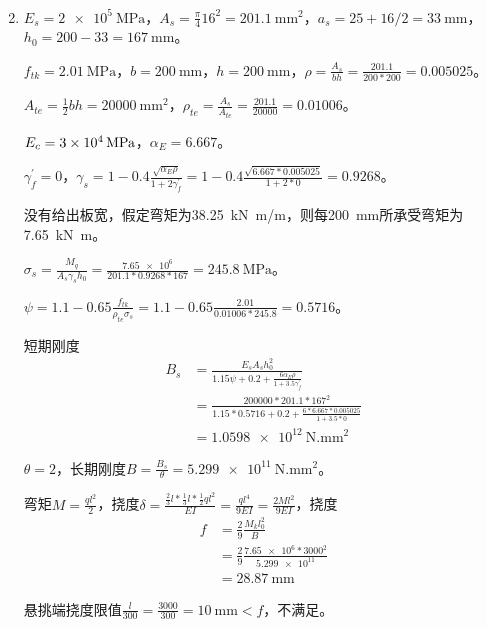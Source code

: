 \begin{enumerate}
\begin{align*}
          \end{align*}
    \item $E_s=\SI{2e5}{\MPa}$，$A_s=\frac{\pi}{4}16^2=\SI{201.1}{\mm^2}$，$a_s=25+16/2=\SI{33}{\mm}$，$h_0=200-33=\SI{167}{\mm}$。
          \par $f_{tk}=\SI{2.01}{\MPa}$，$b=\SI{200}{\mm}$，$h=\SI{200}{\mm}$，$\rho=\frac{A_s}{bh}=\frac{201.1}{200*200}=0.005025$。
          \par $A_{te}=\frac{1}{2}bh=\SI{20000}{\mm^2}$，$\rho_{te}=\frac{A_s}{A_{te}}=\frac{201.1}{20000}=0.01006$。
          \par $E_c=\SI{3E4}{\MPa}$，$\alpha_E=6.667$。
          \par $\gamma_f^\prime=0$，$\gamma_s=1-0.4\frac{\sqrt{\alpha_E\rho}}{1+2\gamma_f^\prime}=1-0.4\frac{\sqrt{6.667*0.005025}}{1+2*0}=0.9268$。
          \par 没有给出板宽，假定弯矩为\SI{38.25}{\kN.\m/\m}，则每\SI{200}{\mm}所承受弯矩为\SI{7.65}{\kN.\m}。
          \par $\sigma_s=\frac{M_q}{A_s\gamma_sh_0}=\frac{\num{7.65e6}}{201.1*0.9268*167}=\SI{245.8}{\MPa}$。
          \par $\psi=1.1-0.65\frac{f_{tk}}{\rho_{te}\sigma_s}=1.1-0.65\frac{2.01}{0.01006*245.8}=0.5716$。
          \par 短期刚度
          \begin{align*}
              B_s & = \frac{E_sA_sh_0^2}{1.15\psi+0.2+\frac{6\alpha_E\rho}{1+3.5\gamma_f^\prime}} \\
                  & = \frac{200000*201.1*167^2}{1.15*0.5716+0.2+\frac{6*6.667*0.005025}{1+3.5*0}} \\
                  & = \SI{1.0598e12}{\N.\mm^2}
          \end{align*}
          \par $\theta=2$，长期刚度$B = \frac{B_s}{\theta} = \SI{5.299e11}{\N.\mm^2}$。
          \par 弯矩$M=\frac{ql^2}{2}$，挠度$\delta=\frac{\frac{2}{3}l*\frac{1}{3}l*\frac{1}{2}ql^2}{EI}=\frac{ql^4}{9EI}=\frac{2Ml^2}{9EI}$，挠度
          \begin{align*}
              f & = \frac{2}{9}\frac{M_kl_0^2}{B}                          \\
                & = \frac{2}{9} \frac{\num{7.65e6}*3000^2}{\num{5.299e11}} \\
                & = \SI{28.87}{\mm}
          \end{align*}
          \par 悬挑端挠度限值$\frac{l}{300}=\frac{3000}{300}=\SI{10}{\mm}<f$，不满足。

\end{enumerate}
